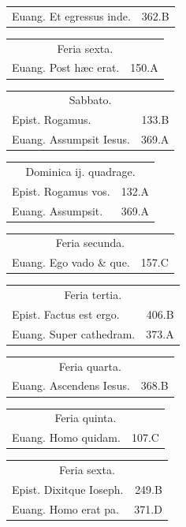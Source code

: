 \documentclass[a5paper,10pt]{book}
\def\ae{æ}
\begin{document}
\begin{multicols*}{2}
\begin{tabular}{l r}
Euang. Et egressus inde. & 362.B\\
\end{tabular}
\begin{tabular}{l r}
\multicolumn{2}{c}{\color{red} Feria sexta.}\\
Euang. Post h\ae c erat. & 150.A\\
\end{tabular}
\begin{tabular}{l r}
\multicolumn{2}{c}{\color{red} Sabbato.}\\
Epist. Rogamus. & 133.B\\
Euang. Assumpsit Iesus. & 369.A\\
\end{tabular}
\begin{tabular}{l r}
\multicolumn{2}{c}{\color{red} Dominica ij. quadrage.}\\
Epist. Rogamus vos. & 132.A\\
Euang. Assumpsit. & 369.A\\
\end{tabular}
\begin{tabular}{l r}
\multicolumn{2}{c}{\color{red} Feria secunda.}\\
Euang. Ego vado \& que. & 157.C\\
\end{tabular}
\begin{tabular}{l r}
\multicolumn{2}{c}{\color{red} Feria tertia.}\\
Epist. Factus est ergo. & 406.B\\
Euang. Super cathedram. & 373.A\\
\end{tabular}
\begin{tabular}{l r}
\multicolumn{2}{c}{\color{red} Feria quarta.}\\
Euang. Ascendens Iesus. & 368.B\\
\end{tabular}
\begin{tabular}{l r}
\multicolumn{2}{c}{\color{red} Feria quinta.}\\
Euang. Homo quidam. & 107.C\\
\end{tabular}
\begin{tabular}{l r}
\multicolumn{2}{c}{\color{red} Feria sexta.}\\
Epist. Dixitque Ioseph. & 249.B\\
Euang. Homo erat pa. & 371.D\\
\end{tabular}

\end{multicols*}
\end{document}

